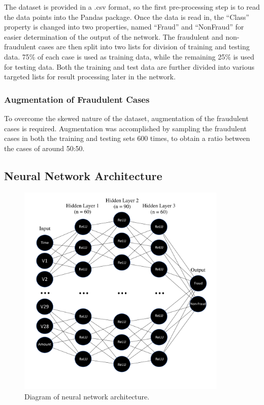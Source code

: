 \documentclass{article}
\begin{document}
 The dataset is provided in a .csv format, so the first pre-processing step is to read the data points 
 into the Pandas package. Once the data is read in, the “Class” property is changed into two properties,
 named “Fraud” and “NonFraud” for easier determination of the output of the network. The fraudulent 
 and non-fraudulent cases are then split into two lists for division of training and testing data. 75\% 
 of each case is used as training data, while the remaining  25\% is used for testing data. Both the 
 training and test data are further divided into various targeted lists for result processing later in the network.

\subsubsection{Augmentation of Fraudulent Cases}

 To overcome the skewed nature of the dataset, augmentation of the fraudulent cases is required. 
 Augmentation was accomplished by sampling the fraudulent cases in both the training and testing sets 600 times, 
 to obtain a ratio between the cases of around 50:50.


\subsection{Neural Network Architecture}

\begin{figure}
  \begin{center}
    \includegraphics[width=100mm]{NeuralNetDiagramPDF.pdf}
    \caption{Diagram of neural network architecture.}
    \label{network-architecture}
  \end{center}
\end{figure}
\end{document}
